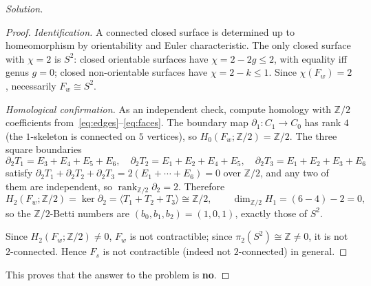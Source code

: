 \documentclass{amsart}
\theoremstyle{definition}
\newcommand{\ZZ}{\mathbb{Z}}
\begin{document}
\begin{proof}[Solution]
\begin{proof}
\emph{Identification.} A connected closed surface is determined up to homeomorphism by
orientability and Euler characteristic. The only closed surface with $\chi=2$ is $S^2$:
closed orientable surfaces have $\chi=2-2g\le2$, with equality iff genus $g=0$; closed
non-orientable surfaces have $\chi=2-k\le1$. Since $\chi(F_w)=2$, necessarily $F_w\cong S^2$.

\emph{Homological confirmation.} As an independent check, compute homology with $\ZZ/2$
coefficients from~\eqref{eq:edges}--\eqref{eq:faces}. The boundary map
$\partial_1:C_1\to C_0$ has rank $4$ (the $1$-skeleton is connected on $5$ vertices), so
$H_0(F_w;\ZZ/2)=\ZZ/2$. The three square boundaries
\[
\partial_2T_1=E_3+E_4+E_5+E_6,\quad
\partial_2T_2=E_1+E_2+E_4+E_5,\quad
\partial_2T_3=E_1+E_2+E_3+E_6
\]
satisfy $\partial_2T_1+\partial_2T_2+\partial_2T_3=2(E_1+\cdots+E_6)=0$ over $\ZZ/2$, and any
two of them are independent, so $\operatorname{rank}_{\ZZ/2}\partial_2=2$. Therefore
\[
H_2(F_w;\ZZ/2)=\ker\partial_2=\langle T_1+T_2+T_3\rangle\cong\ZZ/2,\qquad
\dim_{\ZZ/2}H_1=(6-4)-2=0,
\]
so the $\ZZ/2$-Betti numbers are $(b_0,b_1,b_2)=(1,0,1)$, exactly those of $S^2$.

Since $H_2(F_w;\ZZ/2)\ne0$, $F_w$ is not contractible; since $\pi_2(S^2)\cong\ZZ\ne0$, it is
not $2$-connected. Hence $F_s$ is not contractible (indeed not $2$-connected) in general.
\end{proof}

This proves that the answer to the problem is \textbf{no}.
\end{proof}
\end{document}
